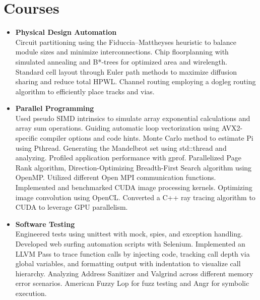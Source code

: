 \documentclass[letterpaper,11pt]{article}
\newcommand{\resumeItem}[2]{
  \item\small{
    \textbf{#1}{\\ #2 \vspace{-2pt}}
  }
}
\newcommand{\resumeSubItem}[2]{\resumeItem{#1}{#2}\vspace{-4pt}}
\newcommand{\resumeSubHeadingListStart}{\begin{itemize}[leftmargin=*]}
\newcommand{\resumeSubHeadingListEnd}{\end{itemize}}
\begin{document}
\section{Courses}
  \resumeSubHeadingListStart
    \resumeSubItem{Physical Design Automation}
      {Circuit partitioning using the Fiduccia–Mattheyses heuristic to balance module sizes and minimize interconnections. 
        Chip floorplanning with simulated annealing and B*-trees for optimized area and wirelength.
        Standard cell layout through Euler path methods to maximize diffusion sharing and reduce total HPWL.
        Channel routing employing a dogleg routing algorithm to efficiently place tracks and vias.}
    \resumeSubItem{Parallel Programming}
      {Used pseudo SIMD intrinsics to simulate array exponential calculations and array sum operations.
      Guiding automatic loop vectorization using AVX2-specific compiler options and code hints. 
      Monte Carlo method to estimate Pi using Pthread. 
      Generating the Mandelbrot set using std::thread and analyzing.
      Profiled application performance with gprof.
      Parallelized Page Rank algorithm, Direction-Optimizing Breadth-First Search algorithm using OpenMP.
      Utilized different Open MPI communication functions.
      Implemented and benchmarked CUDA image processing kernels.
      Optimizing image convolution using OpenCL.
      Converted a C++ ray tracing algorithm to CUDA to leverage GPU parallelism.
      }
    \resumeSubItem{Software Testing}
      {Engineered tests using unittest with mock, spies, and exception handling.
      Developed web surfing automation scripts with Selenium.
      Implemented an LLVM Pass to trace function calls by injecting code, tracking call depth via global variables, and formatting output with indentation to visualize call hierarchy.
      Analyzing Address Sanitizer and Valgrind across different memory error scenarios.
      American Fuzzy Lop for fuzz testing and Angr for symbolic execution.}
  \resumeSubHeadingListEnd
\end{document}
